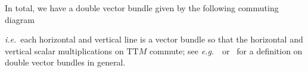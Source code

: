\documentclass[a4paper,oneside,11pt,bibliography=totoc]{scrartcl}
\def\RPlus{\ensuremath{\mathbin{\rule[.13em]{.66em}{.22em}\hspace{-.44em}\rule[-.08em]{.22em}{.66em}\,}}} %
\def\bas#1\eas{\begin{align*}#1\end{align*}}
\theoremstyle{plain}
\theoremstyle{remark}
\theoremstyle{definition}
\begin{document}
In total, we have a double vector bundle given by the following commuting diagram
\begin{center}
\end{center} 
\textit{i.e.}\ each horizontal and vertical line is a vector bundle so that the horizontal and vertical scalar multiplications on $\mathrm{TT}M$ commute; see \textit{e.g.}~\cite[\S 3ff.]{Highervectorbundles}\ or \cite[\S 9.1, page 340ff.]{mackenzieGeneralTheory}\ for a definition on double vector bundles in general.
\end{document}

